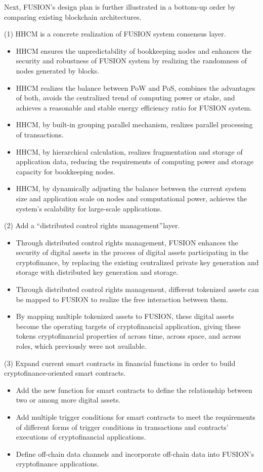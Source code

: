 \documentclass[a4paper,12pt]{article}
\begin{document}
Next, FUSION's design plan is further illustrated in a bottom-up order by comparing existing blockchain architectures.

(1) HHCM is a concrete realization of FUSION system consensus layer.
\begin{itemize} [itemindent = 1em]
\item HHCM ensures the unpredictability of bookkeeping nodes and enhances the security and robustness of FUSION system by realizing the randomness of nodes generated by blocks.
\item HHCM realizes the balance between PoW and PoS, combines the advantages of both, avoids the centralized trend of computing power or stake, and achieves a reasonable and stable energy efficiency ratio for FUSION system.
\item HHCM, by built-in grouping parallel mechanism, realizes parallel processing of transactions.
\item HHCM, by hierarchical calculation, realizes fragmentation and storage of application data, reducing the requirements of computing power and storage capacity for bookkeeping nodes.
\item HHCM, by dynamically adjusting the balance between the current system size and application scale on nodes and computational power, achieves the system's scalability for large-scale applications.
\end{itemize}

(2) Add a “distributed control rights management” layer.
\begin{itemize} [itemindent = 1em]
\item Through distributed control rights management, FUSION enhances the security of digital assets in the process of digital assets participating in the cryptofinance, by replacing the existing centralized private key generation and storage with distributed key generation and storage.
\item Through distributed control rights management, different tokenized assets can be mapped to FUSION to realize the free interaction between them.
\item By mapping multiple tokenized assets to FUSION, these digital assets become the operating targets of cryptofinancial application, giving these tokens cryptofinancial properties of across time, across space, and across roles, which previously were not available.
\end{itemize}

(3) Expand current smart contracts in financial functions in order to build cryptofinance-oriented smart contracts.
\begin{itemize} [itemindent = 1em]
\item Add the new function for smart contracts to define the relationship between two or among more digital assets.
\item Add multiple trigger conditions for smart contracts to meet the requirements of different forms of trigger conditions in transactions and contracts' executions of cryptofinancial applications.
\item Define off-chain data channels and incorporate off-chain data into FUSION's cryptofinance applications.
\end{itemize}
\end{document}
